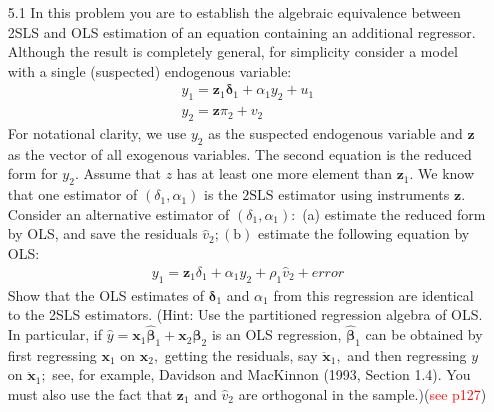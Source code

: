 \begin{enumerate}
    \item[5.1] In this problem you are to establish the algebraic equivalence between 2SLS and OLS estimation of an equation containing an additional regressor. Although the result is completely general, for simplicity consider a model with a single (suspected) endogenous variable: 
    \begin{gather*}
        y_{1}=\mathbf{z}_{1} \boldsymbol{\delta}_{1}+\alpha_{1} y_{2}+u_{1} \\
        y_{2}=\mathbf{z} \pi_{2}+v_{2}
    \end{gather*}
    For notational clarity, we use $y_{2}$ as the suspected endogenous variable and $\mathbf{z}$ as the vector of all exogenous variables. The second equation is the reduced form for $y_{2}$. Assume that $z$ has at least one more element than $\mathbf{z}_{1}$. We know that one estimator of $\left(\delta_{1}, \alpha_{1}\right)$ is the $2 \mathrm{SLS}$ estimator using instruments $\mathbf{z}$. Consider an alternative estimator of $\left(\delta_{1}, \alpha_{1}\right):$ (a) estimate the reduced form by OLS, and save the residuals $\hat{v}_{2} ;(\mathrm{b})$ estimate the following equation by OLS:
    \begin{gather}
    y_{1}=\mathbf{z}_{1} \delta_{1}+\alpha_{1} y_{2}+\rho_{1} \hat{v}_{2}+error \tag{5.52} \label{eq:5.1-1}
    \end{gather}
    Show that the OLS estimates of $\boldsymbol{\delta}_{1}$ and $\alpha_{1}$ from this regression are identical to the 2SLS estimators. (Hint: Use the partitioned regression algebra of OLS. In particular, if $\hat{y}=\mathbf{x}_{1} \hat{\boldsymbol{\beta}}_{1}+\mathbf{x}_{2} \hat{\boldsymbol{\beta}}_{2}$ is an OLS regression, $\hat{\boldsymbol{\beta}}_{1}$ can be obtained by first regressing $\mathbf{x}_{1}$ on $\mathbf{x}_{2},$ getting the residuals, say $\ddot{\mathbf{x}}_{1},$ and then regressing $y$ on $\ddot{\mathbf{x}}_{1} ;$ see, for example, Davidson and MacKinnon (1993, Section 1.4). You must also use the fact that $\mathbf{z}_{1}$ and $\hat{v}_{2}$ are orthogonal in the sample.)(\textcolor{red}{see p127})
    

\end{enumerate}
